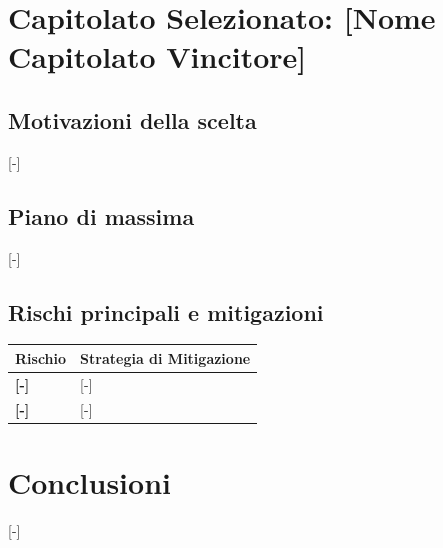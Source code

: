 \section{Capitolato Selezionato: {[Nome Capitolato Vincitore]}}

\subsection{Motivazioni della scelta}
{[-]}

\subsection{Piano di massima}
{[-]}

\subsection{Rischi principali e mitigazioni}
\begin{table}[ht]
	\centering
	\renewcommand{\arraystretch}{1.4}
	\begin{tabularx}{\textwidth}{l X}
		\toprule
		\textbf{Rischio} & \textbf{Strategia di Mitigazione} \\
		\midrule
		\textbf{{[-]}} & {[-]} \\
		\textbf{{[-]}} & {[-]} \\
		\bottomrule
	\end{tabularx}
\end{table}

\section{Conclusioni}
{[-]}